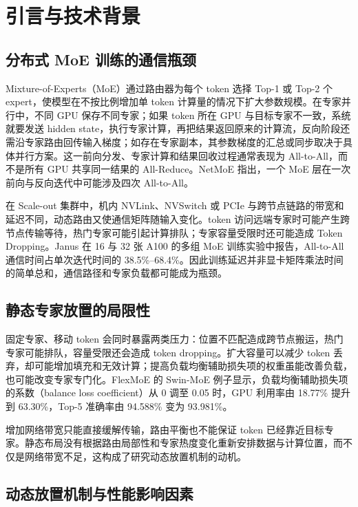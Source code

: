 \section{引言与技术背景}
\label{sec:introduction}

\subsection{分布式 MoE 训练的通信瓶颈}

Mixture-of-Experts（MoE）通过路由器为每个 token 选择 Top-1 或 Top-2 个 expert，使模型在不按比例增加单 token 计算量的情况下扩大参数规模。在专家并行中，不同 GPU 保存不同专家；如果 token 所在 GPU 与目标专家不一致，系统就要发送 hidden state，执行专家计算，再把结果返回原来的计算流，反向阶段还需沿专家路由回传输入梯度；如存在专家副本，其参数梯度的汇总或同步取决于具体并行方案。这一前向分发、专家计算和结果回收过程通常表现为 All-to-All，而不是所有 GPU 共享同一结果的 All-Reduce。NetMoE 指出，一个 MoE 层在一次前向与反向迭代中可能涉及四次 All-to-All\cite{ref3}。

在 Scale-out 集群中，机内 NVLink、NVSwitch 或 PCIe 与跨节点链路的带宽和延迟不同，动态路由又使通信矩阵随输入变化。token 访问远端专家时可能产生跨节点传输等待，热门专家可能引起计算排队；专家容量受限时还可能造成 Token Dropping。Janus 在 16 与 32 张 A100 的多组 MoE 训练实验中报告，All-to-All 通信时间占单次迭代时间的 38.5\%--68.4\%\cite{ref1}。因此训练延迟并非显卡矩阵乘法时间的简单总和，通信路径和专家负载都可能成为瓶颈。

\subsection{静态专家放置的局限性}

固定专家、移动 token 会同时暴露两类压力：位置不匹配造成跨节点搬运，热门专家可能排队，容量受限还会造成 token dropping。扩大容量可以减少 token 丢弃，却可能增加填充和无效计算；提高负载均衡辅助损失项的权重虽能改善负载，也可能改变专家专门化。FlexMoE 的 Swin-MoE 例子显示，负载均衡辅助损失项的系数（balance loss coefficient）从 0 调至 0.05 时，GPU 利用率由 18.77\% 提升到 63.30\%，Top-5 准确率由 94.588\% 变为 93.981\%\cite{ref2}。

增加网络带宽只能直接缓解传输，路由平衡也不能保证 token 已经靠近目标专家。静态布局没有根据路由局部性和专家热度变化重新安排数据与计算位置，而不仅是网络带宽不足，这构成了研究动态放置机制的动机。

\subsection{动态放置机制与性能影响因素}

